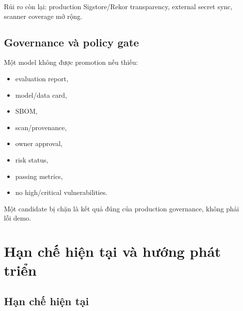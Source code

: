\documentclass[12pt,a4paper,oneside]{report}
\begin{document}
Rủi ro còn lại: production Sigstore/Rekor transparency, external secret sync, scanner coverage mở rộng.

\section{Governance và policy gate}

Một model không được promotion nếu thiếu:

\begin{itemize}
  \item evaluation report,
  \item model/data card,
  \item SBOM,
  \item scan/provenance,
  \item owner approval,
  \item risk status,
  \item passing metrics,
  \item no high/critical vulnerabilities.
\end{itemize}

Một candidate bị chặn là kết quả đúng của production governance, không phải lỗi demo.

\chapter{Hạn chế hiện tại và hướng phát triển}

\section{Hạn chế hiện tại}
\end{document}
